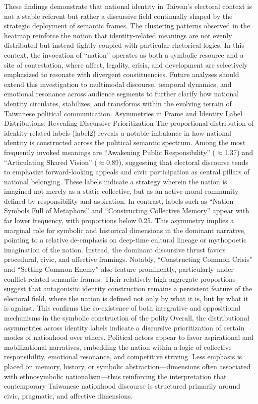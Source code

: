 \documentclass[man,12pt]{apa7}
\begin{document}
These findings demonstrate that national identity in Taiwan's electoral context is not a stable referent but rather a discursive field continually shaped by the strategic deployment of semantic frames. The clustering patterns observed in the heatmap reinforce the notion that identity-related meanings are not evenly distributed but instead tightly coupled with particular rhetorical logics. In this context, the invocation of ``nation'' operates as both a symbolic resource and a site of contestation, where affect, legality, crisis, and development are selectively emphasized to resonate with divergent constituencies. Future analyses should extend this investigation to multimodal discourse, temporal dynamics, and emotional resonance across audience segments to further clarify how national identity circulates, stabilizes, and transforms within the evolving terrain of Taiwanese political communication. 
Asymmetries in Frame and Identity Label Distributions: Revealing Discursive Prioritization
The proportional distribution of identity-related labels (label2) reveals a notable imbalance in how national identity is constructed across the political semantic spectrum. Among the most frequently invoked meanings are ``Awakening Public Responsibility'' ($\approx$1.37) and ``Articulating Shared Vision'' ($\approx$0.89), suggesting that electoral discourse tends to emphasize forward-looking appeals and civic participation as central pillars of national belonging. These labels indicate a strategy wherein the nation is imagined not merely as a static collective, but as an active moral community defined by responsibility and aspiration. 
In contrast, labels such as ``Nation Symbols Full of Metaphors'' and ``Constructing Collective Memory'' appear with far lower frequency, with proportions below 0.25. This asymmetry implies a marginal role for symbolic and historical dimensions in the dominant narrative, pointing to a relative de-emphasis on deep-time cultural lineage or mythopoetic imagination of the nation. Instead, the dominant discursive thrust favors procedural, civic, and affective framings. 
Notably, ``Constructing Common Crisis'' and ``Setting Common Enemy'' also feature prominently, particularly under conflict-related semantic frames. Their relatively high aggregate proportions suggest that antagonistic identity construction remains a persistent feature of the electoral field, where the nation is defined not only by what it is, but by what it is against. This confirms the co-existence of both integrative and oppositional mechanisms in the symbolic construction of the polity.Overall, the distributional asymmetries across identity labels indicate a discursive prioritization of certain modes of nationhood over others. Political actors appear to favor aspirational and mobilizational narratives, embedding the nation within a logic of collective responsibility, emotional resonance, and competitive striving. Less emphasis is placed on memory, history, or symbolic abstraction—dimensions often associated with ethnosymbolic nationalism—thus reinforcing the interpretation that contemporary Taiwanese nationhood discourse is structured primarily around civic, pragmatic, and affective dimensions.
\end{document}
